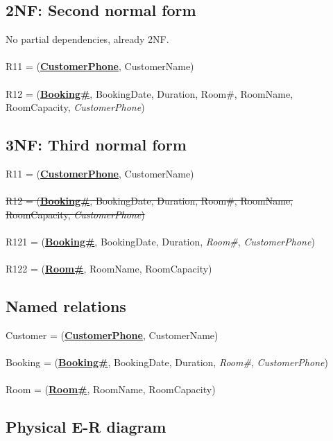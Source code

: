 \subsection{2NF: Second normal form}

No partial dependencies, already 2NF.
\\\\
R11 = (\textbf{\underline{CustomerPhone}}, CustomerName)
\\\\
R12 = (\textbf{\underline{Booking\#}}, BookingDate, Duration, Room\#, RoomName, RoomCapacity, \emph{CustomerPhone})

\subsection{3NF: Third normal form}

R11 = (\textbf{\underline{CustomerPhone}}, CustomerName)
\\\\
\sout{R12 = (\textbf{\underline{Booking\#}}, BookingDate, Duration, Room\#, RoomName, RoomCapacity, \emph{CustomerPhone})}
\\\\
R121 = (\textbf{\underline{Booking\#}}, BookingDate, Duration, \emph{Room\#}, \emph{CustomerPhone})
\\\\
R122 = (\textbf{\underline{Room\#}}, RoomName, RoomCapacity)

\subsection{Named relations}

Customer = (\textbf{\underline{CustomerPhone}}, CustomerName)
\\\\
Booking = (\textbf{\underline{Booking\#}}, BookingDate, Duration, \emph{Room\#}, \emph{CustomerPhone})
\\\\
Room = (\textbf{\underline{Room\#}}, RoomName, RoomCapacity)

\subsection{Physical E-R diagram}